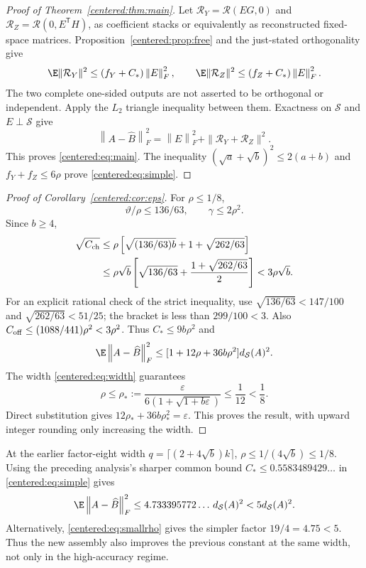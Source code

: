 \documentclass[11pt,oneside,openany,a4paper]{book}
\numberwithin{equation}{chapter}
\theoremstyle{definition}
\theoremstyle{remark}
\newcommand{\F}[1]{\left\lVert#1\right\rVert_F}
\begin{document}
\begin{proof}[Proof of Theorem~\ref{centered:thm:main}]
Let $\mathcal R_Y=\mathcal R(EG,0)$ and $\mathcal R_Z=\mathcal R(0,E^{\mathsf T}H)$, as coefficient stacks or equivalently as reconstructed fixed-space matrices. Proposition~\ref{centered:prop:free} and the just-stated orthogonality give
\[
 \E\|\mathcal R_Y\|^2\le(f_Y+C_*)\F E^2,\qquad
 \E\|\mathcal R_Z\|^2\le(f_Z+C_*)\F E^2.
\]
The two complete one-sided outputs are not asserted to be orthogonal or independent. Apply the $L_2$ triangle inequality between them. Exactness on $\mathcal S$ and $E\perp\mathcal S$ give
\[
 \F{A-\widehat B}^2=\F E^2+\|\mathcal R_Y+\mathcal R_Z\|^2.
\]
This proves \eqref{centered:eq:main}. The inequality $(\sqrt a+\sqrt b)^2\le2(a+b)$ and $f_Y+f_Z\le6\rho$ prove \eqref{centered:eq:simple}.
\end{proof}

\begin{proof}[Proof of Corollary~\ref{centered:cor:eps}]
For $\rho\le1/8$,
\[
 \vartheta/\rho\le136/63,\qquad \gamma\le2\rho^2.
\]
Since $b\ge4$,
\begin{align*}
 \sqrt{C_{\rm ch}}
 &\le\rho\left[\sqrt{(136/63)b}+1+\sqrt{262/63}\right]\\
 &\le\rho\sqrt b\left[\sqrt{136/63}+\frac{1+\sqrt{262/63}}2\right]
 <3\rho\sqrt b.
\end{align*}
For an explicit rational check of the strict inequality, use
$\sqrt{136/63}<147/100$ and $\sqrt{262/63}<51/25$; the bracket is less than $299/100<3$.
Also $C_{\rm off}\le(1088/441)\rho^2<3\rho^2$. Thus $C_*\le9b\rho^2$ and
\begin{equation}\label{centered:eq:smallrho}
 \E\F{A-\widehat B}^2\le[1+12\rho+36b\rho^2]d_{\mathcal S}(A)^2.
\end{equation}
The width \eqref{centered:eq:width} guarantees
\[
 \rho\le\rho_*:=\frac{\varepsilon}{6(1+\sqrt{1+b\varepsilon})}\le\frac1{12}<\frac18.
\]
Direct substitution gives $12\rho_*+36b\rho_*^2=\varepsilon$. This proves the result, with upward integer rounding only increasing the width.
\end{proof}

At the earlier factor-eight width $q=\lceil(2+4\sqrt b)k\rceil$, $\rho\le1/(4\sqrt b)\le1/8$. Using the preceding analysis's sharper common bound $C_*\le0.5583489429\ldots$ in \eqref{centered:eq:simple} gives
\[
 \E\F{A-\widehat B}^2\le4.733395772\ldots\,d_{\mathcal S}(A)^2<5d_{\mathcal S}(A)^2.
\]
Alternatively, \eqref{centered:eq:smallrho} gives the simpler factor $19/4=4.75<5$. Thus the new assembly also improves the previous constant at the same width, not only in the high-accuracy regime.
\end{document}
